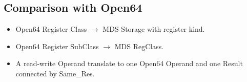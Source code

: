 \documentclass[11pt,a4paper]{article}
\begin{document}
\subsection{Comparison with Open64}

\begin{itemize}

\item Open64 Register Class $\rightarrow$ MDS Storage with register kind.

\item Open64 Register SubClass $\rightarrow$ MDS RegClass.

\item A read-write Operand translate to one Open64 Operand and one Result
connected by Same\_Res.

\end{itemize}
\end{document}
